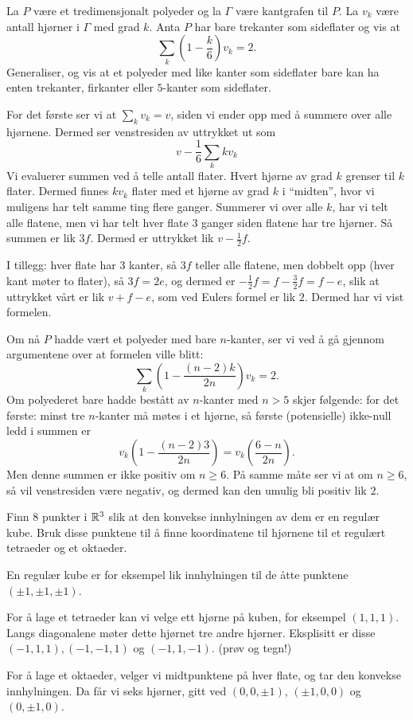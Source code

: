 \documentclass[11pt, norsk]{article}
\begin{document}
\begin{oppg}
  La $P$ være et tredimensjonalt polyeder og la $\Gamma$ være kantgrafen til $P$. La $v_k$ være antall hjørner i $\Gamma$ med grad $k$. Anta $P$ har bare trekanter som sideflater og vis at 
\[
\sum_k \left( 1 - \frac k6 \right)v_k = 2.
\]
Generaliser, og vis at et polyeder med like kanter som sideflater bare kan ha enten trekanter, firkanter eller $5$-kanter som sideflater.
\end{oppg}
\begin{losn}
For det første ser vi at $\sum_k v_k = v$, siden vi ender opp med å summere over alle hjørnene. Dermed ser venstresiden av uttrykket ut som 
\[
v - \frac 16 \sum_k kv_k 
\]
Vi evaluerer summen ved å telle antall flater. Hvert hjørne av grad $k$ grenser til $k$ flater. Dermed finnes $kv_k$ flater med et hjørne av grad $k$ i ``midten'', hvor vi muligens har telt samme ting flere ganger. Summerer vi over alle $k$, har vi telt alle flatene, men vi har telt hver flate $3$ ganger siden flatene har tre hjørner. Så summen er lik $3f$. Dermed er uttrykket lik $v-\frac 12 f$. 

I tillegg: hver flate har $3$ kanter, så $3f$ teller alle flatene, men dobbelt opp (hver kant møter to flater), så $3f=2e$, og dermed er $-\frac 12 f = f - \frac 32  f = f - e$, slik at uttrykket vårt er lik $v+f-e$, som ved Eulers formel er lik $2$. Dermed har vi vist formelen.

Om nå $P$ hadde vært et polyeder med bare $n$-kanter, ser vi ved å gå gjennom argumentene over at formelen ville blitt:
\[
\sum_k \left( 1 - \frac{(n-2)k}{2n} \right)v_k = 2.
\]
Om polyederet bare hadde bestått av $n$-kanter med $n > 5$ skjer følgende: for det første: minst tre $n$-kanter må møtes i et hjørne, så første (potensielle) ikke-null ledd i summen er
\[
v_k \left( 1- \frac{(n-2)3}{2n} \right) = v_k \left( \frac{6-n}{2n} \right).
\]
Men denne summen er ikke positiv om $n \geq 6$. På samme måte ser vi at om $n \geq 6$, så vil venstresiden være negativ, og dermed kan den umulig bli positiv lik $2$. 
\end{losn}

\begin{oppg}
Finn $8$ punkter i $\mathbb{R}^3$ slik at den konvekse innhylningen av dem er en regulær kube. Bruk disse punktene til å finne koordinatene til hjørnene til et regulært tetraeder og et oktaeder.
\end{oppg}
\begin{losn}
En regulær kube er for eksempel lik innhylningen til de åtte punktene $(\pm 1,\pm 1, \pm 1)$. 

For å lage et tetraeder kan vi velge ett hjørne på kuben, for eksempel $(1,1,1)$. Langs diagonalene møter dette hjørnet tre andre hjørner. Eksplisitt er disse $(-1,1,1),(-1,-1,1)$ og $(-1,1,-1)$. (prøv og tegn!)

For å lage et oktaeder, velger vi midtpunktene på hver flate, og tar den konvekse innhylningen. Da får vi seks hjørner, gitt ved $(0,0,\pm 1)$, $(\pm 1,0,0)$ og $(0,\pm 1, 0)$.
\end{losn}
\end{document}
